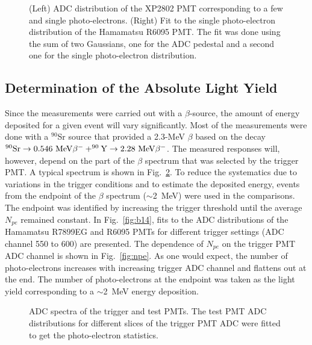 \begin{figure}[tb]
\vspace{90mm} 
\caption{\small{(Left) ADC distribution of the XP2802 PMT corresponding to a 
few and single photo-electrons.  (Right) Fit to the single photo-electron 
distribution of the Hamamatsu R6095 PMT.  The fit was done using the sum of 
two Gaussians, one for the ADC pedestal and a second one for the single 
photo-electron distribution.}}
\label{fig:sing}
\end{figure}

\subsection{Determination of the Absolute Light Yield}

Since the measurements were carried out with a $\beta$-source, the amount 
of energy deposited for a given event will vary significantly.  Most of 
the measurements were done with a $^{90}$Sr source that provided a 2.3-MeV 
$\beta$ based on the decay $^{90}{\rm Sr} \to 0.546~{\rm MeV} \beta^- +
^{90}{\rm Y}  \to 2.28~{\rm MeV} \beta^-$.  The measured responses will,
however, depend on the part of the $\beta$ spectrum that was selected by the 
trigger PMT.  A typical spectrum is shown in Fig.~\ref{fig:trigpm}.  To reduce 
the systematics due to variations in the trigger conditions and to estimate 
the deposited energy, events from the endpoint of the $\beta$ spectrum 
($\sim$2~MeV) were used in the comparisons.  The endpoint was identified by 
increasing the trigger threshold until the average $N_{pe}$ remained constant. 
In Fig.~\ref{fig:b14}, fits to the ADC distributions of the Hamamatsu R7899EG 
and R6095 PMTs for different trigger settings (ADC channel 550 to 600) are 
presented.  The dependence of $N_{pe}$ on the trigger PMT ADC channel is 
shown in Fig.~\ref{fig:npe}.  As one would expect, the number of 
photo-electrons increases with increasing trigger ADC channel and flattens 
out at the end.  The number of photo-electrons at the endpoint was taken as 
the light yield corresponding to a $\sim$2~MeV energy deposition.

\begin{figure}[h!t]
\vspace{130mm} 
\caption{\small{ADC spectra of the trigger and test PMTs. The test PMT ADC
distributions for different slices of the trigger PMT ADC were fitted to get 
the photo-electron statistics.}} 
\label{fig:trigpm}
\end{figure}

